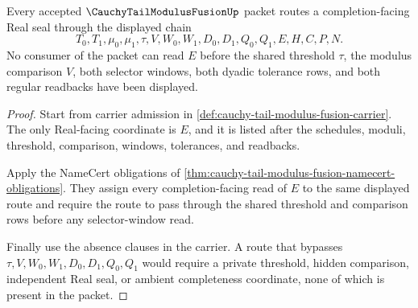 \begin{theorem}
\label{thm:cauchy-tail-modulus-fusion-shared-tail-exhaustion}
Every accepted $\CauchyTailModulusFusionUp$ packet routes a completion-facing Real seal through the displayed chain
$$
T_0,T_1,\mu_0,\mu_1,\tau,V,W_0,W_1,D_0,D_1,Q_0,Q_1,E,H,C,P,N.
$$
No consumer of the packet can read $E$ before the shared threshold $\tau$, the modulus comparison $V$, both selector windows, both dyadic tolerance rows, and both regular readbacks have been displayed.
\end{theorem}
\begin{proof}
Start from carrier admission in \autoref{def:cauchy-tail-modulus-fusion-carrier}. The only Real-facing coordinate is $E$, and it is listed after the schedules, moduli, threshold, comparison, windows, tolerances, and readbacks.

Apply the NameCert obligations of \autoref{thm:cauchy-tail-modulus-fusion-namecert-obligations}. They assign every completion-facing read of $E$ to the same displayed route and require the route to pass through the shared threshold and comparison rows before any selector-window read.

Finally use the absence clauses in the carrier. A route that bypasses $\tau,V,W_0,W_1,D_0,D_1,Q_0,Q_1$ would require a private threshold, hidden comparison, independent Real seal, or ambient completeness coordinate, none of which is present in the packet.
\end{proof}

